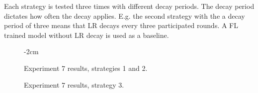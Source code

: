 \begin{table}[H]
    \center
    \hspace*{-9mm} 
    \caption[Experiment 7 parameters]{Experiment 7 parameters}
    \label{table:Experiment 7 parameters}
\end{table}

Each strategy is tested three times with different decay periods. The decay period dictates how often the decay applies. E.g. the second strategy with the a decay period of three means that LR decays every three participated rounds. A FL trained model without LR decay is used as a baseline.
\medskip\medskip
\begin{figure}[H]
    \center
    \addtolength{\leftskip} {-2cm}
    \addtolength{\rightskip}{-2cm}
    
    \caption[Experiment 7 results]{Experiment 7 results, strategies 1 and 2.}
\end{figure}%
\begin{figure}[H]\ContinuedFloat
    \center
    
    \caption[Experiment 7 results]{Experiment 7 results, strategy 3.}
    \label{fig:Experiment 7 results}
\end{figure}

